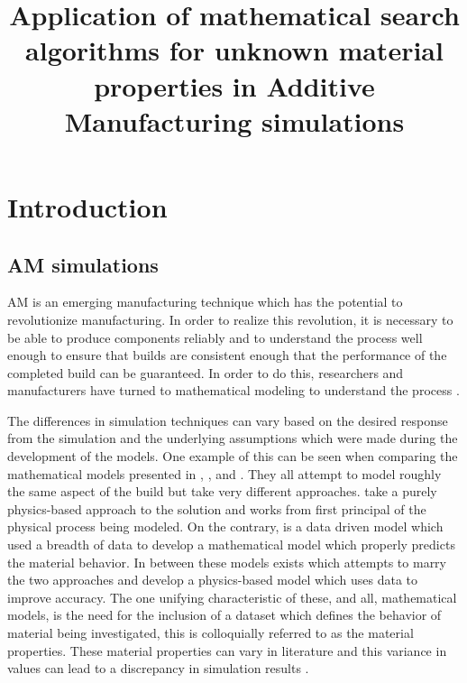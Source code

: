 \documentclass[pdflatex,sn-mathphys]{sn-jnl}
\title[Searching for unknown material properties for AM simulations]{Application of mathematical search algorithms for unknown material properties in Additive Manufacturing simulations}
\begin{document}
\maketitle

\section{Introduction}
	\subsection{\Acf{AM} simulations} \label{introAMsim}

	\Acf{AM} is an emerging manufacturing technique which has the potential to revolutionize manufacturing.  In order to realize this revolution, it is necessary to be able to produce components reliably and to understand the process well enough to ensure that builds are consistent enough that the performance of the completed build can be guaranteed.  In order to do this, researchers and manufacturers have turned to mathematical modeling to understand the process \cite{wangClosedLoopHighFidelitySimulation2021}.

	The differences in simulation techniques can vary based on the desired response from the simulation and the underlying assumptions which were made during the development of the models.
	One example of this can be seen when comparing the mathematical models presented in \cite{wangClosedLoopHighFidelitySimulation2021}, \cite{royDatadrivenModelingThermal2020}, and \cite{mogesHYBRIDMODELINGAPPROACH2020}.  They all attempt to model roughly the same aspect of the build but take very different approaches.
	\cite{wangClosedLoopHighFidelitySimulation2021} take a purely physics-based approach to the solution and works from first principal of the physical process being modeled.
	On the contrary, \cite{royDatadrivenModelingThermal2020} is a data driven model which used a breadth of data to develop a mathematical model which properly predicts the material behavior. 
	In between these models exists \cite{mogesHYBRIDMODELINGAPPROACH2020} which attempts to marry the two approaches and develop a physics-based model which uses data to improve accuracy.
	The one unifying characteristic of these, and all, mathematical models, is the need for the inclusion of a dataset which defines the behavior of material being investigated, this is colloquially referred to as the material properties.  These material properties can vary in literature and this variance in values can lead to a discrepancy in simulation results \cite{Daryabeigi2011}.
\end{document}
